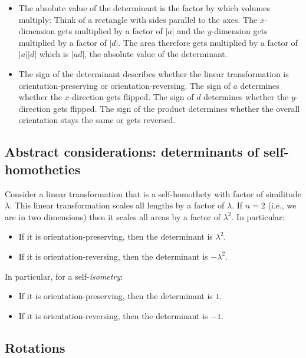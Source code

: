 \documentclass[10pt]{amsart}
\begin{document}
\begin{itemize}
\item The absolute value of the determinant is the factor by which
  volumes multiply: Think of a rectangle with sides parallel to the
  axes. The $x$-dimension gets multiplied by a factor of $|a|$ and the
  $y$-dimension gets multiplied by a factor of $|d|$. The area
  therefore gets multiplied by a factor of $|a||d|$ which is $|ad|$,
  the absolute value of the determinant.
\item The sign of the determinant describes whether the linear
  transformation is orientation-preserving or
  orientation-reversing. The sign of $a$ determines whether the
  $x$-direction gets flipped. The sign of $d$ determines whether the
  $y$-direction gets flipped. The sign of the product determines
  whether the overall orientation stays the same or gets reversed.
\end{itemize}

\subsection{Abstract considerations: determinants of self-homotheties}

Consider a linear transformation that is a self-homothety with factor
of similitude $\lambda$. This linear transformation scales all lengths
by a factor of $\lambda$. If $n = 2$ (i.e., we are in two dimensions)
then it scales all areas by a factor of $\lambda^2$. In particular:

\begin{itemize}
\item If it is orientation-preserving, then the determinant is $\lambda^2$.
\item If it is orientation-reversing, then the determinant is $-\lambda^2$.
\end{itemize}

In particular, for a self-{\em isometry}:

\begin{itemize}
\item If it is orientation-preserving, then the determinant is $1$.
\item If it is orientation-reversing, then the determinant is $-1$.
\end{itemize}

\subsection{Rotations}
\end{document}
